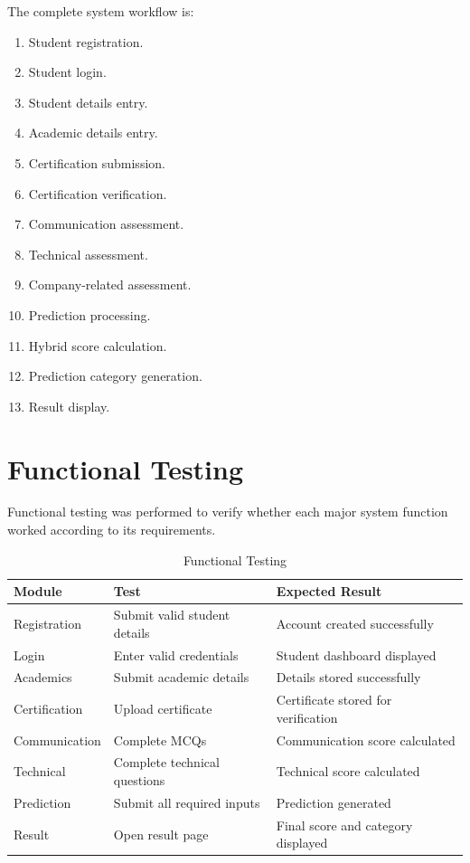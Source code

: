 \documentclass[12pt,a4paper]{report}
\begin{document}
The complete system workflow is:

\begin{enumerate}
    \item Student registration.
    \item Student login.
    \item Student details entry.
    \item Academic details entry.
    \item Certification submission.
    \item Certification verification.
    \item Communication assessment.
    \item Technical assessment.
    \item Company-related assessment.
    \item Prediction processing.
    \item Hybrid score calculation.
    \item Prediction category generation.
    \item Result display.
\end{enumerate}

\section{Functional Testing}

Functional testing was performed to verify whether each major
system function worked according to its requirements.

\begin{table}[H]
\centering
\caption{Functional Testing}

\begin{tabularx}{\textwidth}
{p{}p{}Y}
\toprule
\textbf{Module} & \textbf{Test} & \textbf{Expected Result} \\
\midrule
Registration & Submit valid student details &
Account created successfully \\

Login & Enter valid credentials &
Student dashboard displayed \\

Academics & Submit academic details &
Details stored successfully \\

Certification & Upload certificate &
Certificate stored for verification \\

Communication & Complete MCQs &
Communication score calculated \\

Technical & Complete technical questions &
Technical score calculated \\

Prediction & Submit all required inputs &
Prediction generated \\

Result & Open result page &
Final score and category displayed \\
\bottomrule
\end{tabularx}
\end{table}
\end{document}
